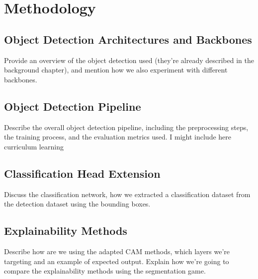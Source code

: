 \chapter{Methodology}
\section{Object Detection Architectures and Backbones}
Provide an overview of the object detection used (they're already described in the background chapter), and mention how we also experiment with different backbones.

\section{Object Detection Pipeline}
Describe the overall object detection pipeline, including the preprocessing steps, the training process, and the evaluation metrics used. I might include here curriculum learning

\section{Classification Head Extension}
Discuss the classification network, how we extracted a classification dataset from the detection dataset using the bounding boxes. 

\section{Explainability Methods}
Describe how are we using the adapted CAM methods, which layers we're targeting and an example of expected output.
Explain how we're going to compare the explainability methods using the segmentation game.